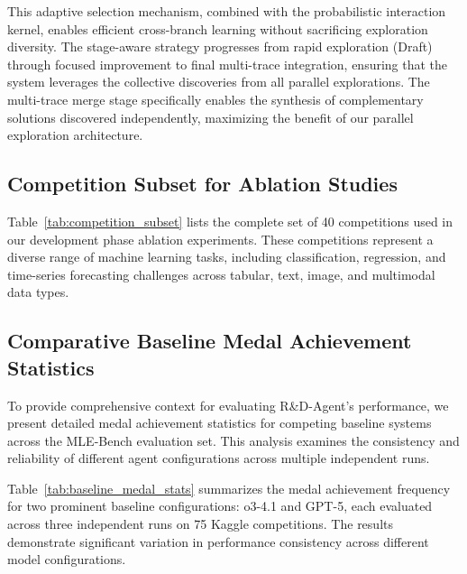 This adaptive selection mechanism, combined with the probabilistic interaction kernel, enables efficient cross-branch learning without sacrificing exploration diversity. The stage-aware strategy progresses from rapid exploration (Draft) through focused improvement to final multi-trace integration, ensuring that the system leverages the collective discoveries from all parallel explorations. The multi-trace merge stage specifically enables the synthesis of complementary solutions discovered independently, maximizing the benefit of our parallel exploration architecture.



\subsection{Competition Subset for Ablation Studies}
\label{sec:competition_subset}

Table~\ref{tab:competition_subset} lists the complete set of 40 competitions used in our development phase ablation experiments. These competitions represent a diverse range of machine learning tasks, including classification, regression, and time-series forecasting challenges across tabular, text, image, and multimodal data types.

\subsection{Comparative Baseline Medal Achievement Statistics}

To provide comprehensive context for evaluating R\&D-Agent's performance, we present detailed medal achievement statistics for competing baseline systems across the MLE-Bench evaluation set. This analysis examines the consistency and reliability of different agent configurations across multiple independent runs.

Table~\ref{tab:baseline_medal_stats} summarizes the medal achievement frequency for two prominent baseline configurations: o3-4.1 and GPT-5, each evaluated across three independent runs on 75 Kaggle competitions. The results demonstrate significant variation in performance consistency across different model configurations.


